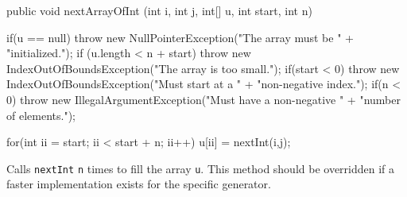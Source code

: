 \begin{code}

   public void nextArrayOfInt (int i, int j, int[] u, int start, int n) \begin{hide} {
      if(u == null)
         throw new NullPointerException("The array must be " +
                                        "initialized.");
      if (u.length < n + start)
         throw new IndexOutOfBoundsException("The array is too small.");
      if(start < 0)
         throw new IndexOutOfBoundsException("Must start at a " +
                                             "non-negative index.");
      if(n < 0)
         throw new IllegalArgumentException("Must have a non-negative " +
                                            "number of elements.");

      for(int ii = start; ii < start + n; ii++)
         u[ii] = nextInt(i,j);
   } \end{hide}
\end{code} 
\begin{tabb} Calls \texttt{nextInt} \texttt{n} times to fill the array \texttt{u}.
  This method should be overridden if a faster implementation exists for
  the specific generator.
\end{tabb}
\begin{htmlonly}
\end{htmlonly}

